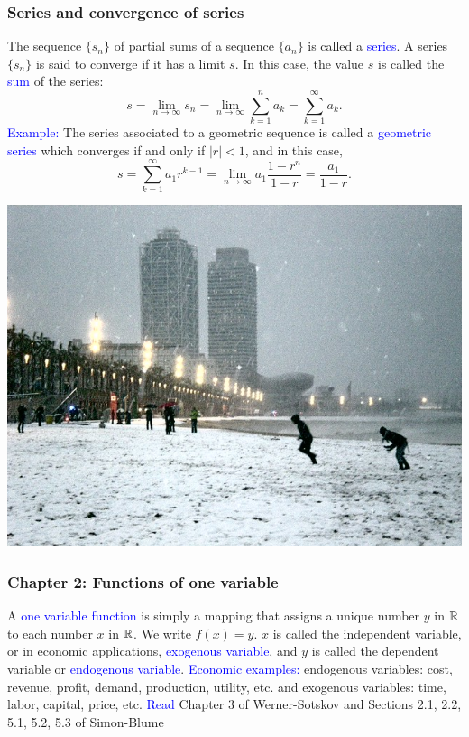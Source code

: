 \documentclass[11pt,aspectratio=169]{beamer}
\begin{document}
\begin{frame}
\frametitle{Series and convergence of series}
The sequence $\{s_n\}$ of partial sums of a sequence $\{a_n\}$ is called a \textcolor{blue}{series}. 
\vskip 12pt
A series $\{ s_n\}$ is said to converge if it has a limit $s$. In this case, the value $s$ is called the \textcolor{blue}{sum} of the series:
$$
s=\lim_{n \rightarrow \infty} s_n=\lim_{n \rightarrow \infty} \sum_{k=1}^n a_k
=\sum_{k=1}^{\infty} a_k.
$$
\vskip 12pt
\textcolor{blue}{Example:} The series associated to a  geometric sequence is called a \textcolor{blue}{geometric series} which converges if and only if $\vert r \vert <1$, and in this case,
$$
s=\sum_{k=1}^{\infty} a_1 r^{k-1}=\lim_{n \rightarrow \infty}
a_1 \frac{1-r^n}{1-r}=\frac{a_1}{1-r}. 
$$


\end{frame}


\begin{frame}[plain] %
  \centering\includegraphics[height=\paperheight]{vbreaks/vb2.jpg}
\end{frame}





\begin{frame}
\frametitle{Chapter 2: Functions of one variable}


A \textcolor{blue}{one variable function} is simply a mapping that assigns a unique number $y$ in $\mathbb R$ to each number $x$ in $\mathbb R$. We write $f(x)=y$. 
\vskip 12pt
$x$ is called the independent variable, or in economic applications, \textcolor{blue}{exogenous variable}, and $y$ is called the dependent variable or \textcolor{blue}{endogenous variable}.
\vskip 12pt
\textcolor{blue}{Economic examples:} endogenous variables: cost, revenue, profit, demand, production, utility, etc. and exogenous variables: time, labor, capital, price, etc.
\vskip 12pt
\textcolor{blue}{Read} Chapter 3 of Werner-Sotskov and Sections 2.1, 2.2, 5.1, 5.2, 5.3 of Simon-Blume
\end{frame}
\end{document}
